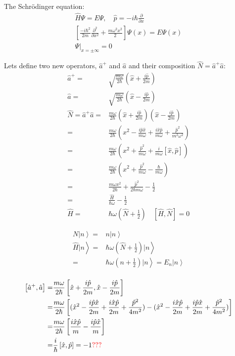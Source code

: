 	The Schr\"odinger equation:
	\begin{align}
		\hat{H}\Psi = E\Psi, \quad \hat{p} = -i\hbar\frac{\partial}{\partial x} \\
		\left[\frac{-i\hbar^2}{2m} \frac{\partial^2}{\partial x^2} + \frac{m\omega^2x^2}{2}\right]\Psi(x) = E\Psi(x) \\
		\Psi|_{x = \pm \infty} = 0
	\end{align}
	
	Lets define two new operators, $\hat{a}^+$ and $\hat{a}$ and their composition $\hat{N} = \hat{a}^+\hat{a}$:
	\begin{align}
		\hat{a}^+ =& \sqrt{\frac{m\omega}{2\hbar}}\left(\hat{x} + \frac{i\hat{p}}{2m}\right) \\
		\hat{a} =& \sqrt{\frac{m\omega}{2\hbar}}\left(\hat{x} - \frac{i\hat{p}}{2m}\right) \\
		\hat{N} = \hat{a}^+\hat{a} =& \frac{m\omega}{2\hbar}\left(\hat{x} + \frac{i\hat{p}}{2m}\right)\left(\hat{x} - \frac{i\hat{p}}{2m}\right)\\
		=& \frac{m\omega}{2\hbar}\left( x^2 - \frac{i\hat{p}\hat{x}}{m\omega} + \frac{i\hat{x}\hat{p}}{m\omega} + \frac{\hat{p}^2}{m^2\omega^2} \right)\\
		=& \frac{m\omega}{2\hbar}\left(x^2 + \frac{\hat{p}^2}{m\omega} + \frac{i}{m\omega}\left[\hat{x}, \hat{p}\right]\right)\\
		=&\frac{m\omega}{2\hbar}\left(x^2 + \frac{\hat{p}^2}{m\omega} - \frac{\hbar}{m\omega}\right)\\
		=& \frac{m\omega x^2}{2\hbar} + \frac{\hat{p}^2}{2\hbar m\omega} - \frac{1}{2}\\
		=& \frac{\hat{H}}{\hbar\omega} - \frac{1}{2}\\
		\hat{H} =& \hbar\omega\left(\hat{N} + \frac{1}{2}\right)\quad \left[\hat{H}, \hat{N}\right] = 0
	\end{align}

	\begin{align}
		\left. N | n \right\rangle =& \left. n |n \right\rangle \\
		\left. \hat{H} | n \right\rangle =& \left. \hbar\omega\left(\hat{N} + \frac{1}{2}\right) | n \right\rangle\\
		 =& \left. \hbar\omega\left(n + \frac{1}{2}\right) | n \right\rangle = \left. E_n | n \right\rangle\\		
	\end{align}

	\begin{align}
		\left[\hat{a}^+, \hat{a}\right] =& \frac{m\omega}{2\hbar}\left[\hat{x} + \frac{i\hat{p}}{2m}, \hat{x} - \frac{i\hat{p}}{2m}\right]\\
		=& \frac{m\omega}{2\hbar}\left[(\hat{x}^2 - \frac{i\hat{p}\hat{x}}{2m} + \frac{i\hat{x}\hat{p}}{2m} +\frac{\hat{p}^2}{4m^2}) - (\hat{x}^2  - \frac{i\hat{x}\hat{p}}{2m} + \frac{i\hat{p}\hat{x}}{2m} +\frac{\hat{p}^2}{4m^2})\right] \\
		=& \frac{m\omega}{2\hbar}\left[\frac{i\hat{x}\hat{p}}{m} -\frac{i\hat{p}\hat{x}}{m}\right]\\
		=& \frac{i}{\hbar}\left[\hat{x}, \hat{p}\right] = -1 \text{\textcolor{red}{???}}
	\end{align}

